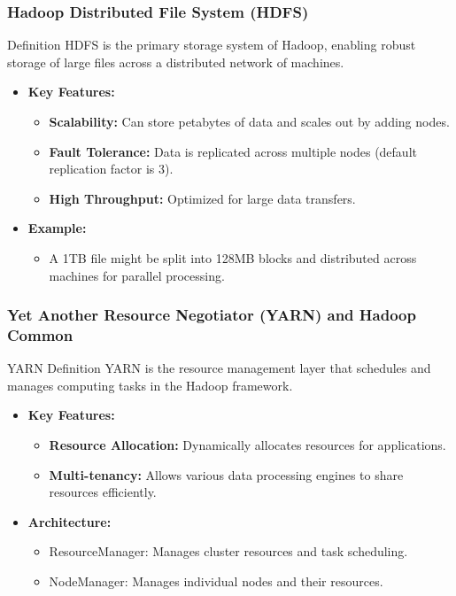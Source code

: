 \documentclass[aspectratio=169]{beamer}
\begin{document}
\begin{frame}[fragile]
    \frametitle{Hadoop Distributed File System (HDFS)}
    \begin{block}{Definition}
        HDFS is the primary storage system of Hadoop, enabling robust storage of large files across a distributed network of machines.
    \end{block}
    \begin{itemize}
        \item \textbf{Key Features:}
        \begin{itemize}
            \item \textbf{Scalability:} Can store petabytes of data and scales out by adding nodes.
            \item \textbf{Fault Tolerance:} Data is replicated across multiple nodes (default replication factor is 3).
            \item \textbf{High Throughput:} Optimized for large data transfers.
        \end{itemize}
        \item \textbf{Example:} 
        \begin{itemize}
            \item A 1TB file might be split into 128MB blocks and distributed across machines for parallel processing.
        \end{itemize}
    \end{itemize}
\end{frame}

\begin{frame}[fragile]
    \frametitle{Yet Another Resource Negotiator (YARN) and Hadoop Common}
    \begin{block}{YARN Definition}
        YARN is the resource management layer that schedules and manages computing tasks in the Hadoop framework.
    \end{block}
    \begin{itemize}
        \item \textbf{Key Features:}
        \begin{itemize}
            \item \textbf{Resource Allocation:} Dynamically allocates resources for applications.
            \item \textbf{Multi-tenancy:} Allows various data processing engines to share resources efficiently.
        \end{itemize}
        \item \textbf{Architecture:}
        \begin{itemize}
            \item ResourceManager: Manages cluster resources and task scheduling.
            \item NodeManager: Manages individual nodes and their resources.
        \end{itemize}
    \end{itemize}
\end{frame}
\end{document}
